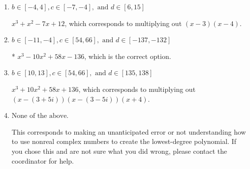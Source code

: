 \documentclass{extbook}[14pt]
\begin{document}
\begin{enumerate}
{\begin{enumerate}[label=\Alph*.]
$x^{3} + x^{2} -9 x + 20$, which corresponds to multiplying out $(x -5)(x -4)$.
\item \( b \in [-4, 4], c \in [-7, -4], \text{ and } d \in [6, 15] \)

$x^{3} + x^{2} -7 x + 12$, which corresponds to multiplying out $(x -3)(x -4)$.
\item \( b \in [-11, -4], c \in [54, 66], \text{ and } d \in [-137, -132] \)

* $x^{3} -10 x^{2} +58 x -136$, which is the correct option.
\item \( b \in [10, 13], c \in [54, 66], \text{ and } d \in [135, 138] \)

$x^{3} +10 x^{2} +58 x + 136$, which corresponds to multiplying out $(x-(3 + 5 i))(x-(3 - 5 i))(x + 4)$.
\item \( \text{None of the above.} \)

This corresponds to making an unanticipated error or not understanding how to use nonreal complex numbers to create the lowest-degree polynomial. If you chose this and are not sure what you did wrong, please contact the coordinator for help.
\end{enumerate}

}
\end{enumerate}
\end{document}
